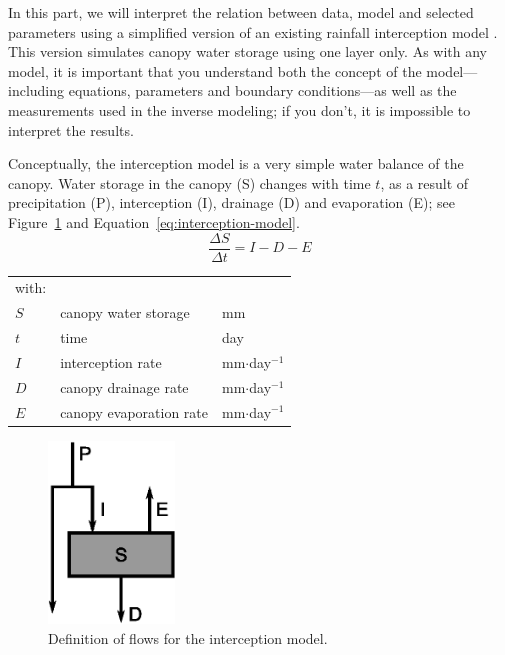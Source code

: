 In this part, we will interpret the relation between data, model and selected parameters using a simplified version of an existing rainfall interception model \citep{bout-scha-aert-verm1996}. This version simulates canopy water storage using one layer only. As with any model, it is important that you understand both the concept of the model---including equations, parameters and boundary conditions---as well as the measurements used in the inverse modeling; if you don't, it is impossible to interpret the results.

Conceptually, the interception model is a very simple water balance of the canopy. Water storage in the canopy (S) changes with time $t$, as a result of precipitation (P), interception (I), drainage (D) and evaporation (E); see Figure~\ref{fig:interception-model-flows} and Equation~\ref{eq:interception-model}. 
\begin{equation}
\label{eq:interception-model}
\frac{\Delta S}{\Delta t} = I-D-E
\end{equation}
\begin{tabular}{lll}
with:&&\\
$S$&canopy water storage&\textsf{mm}\\
$t$&time&\textsf{day}\\
$I$&interception rate&\textsf{mm$\cdot{}$day$^{-1}$}\\
$D$&canopy drainage rate&\textsf{mm$\cdot{}$day$^{-1}$}\\
$E$&canopy evaporation rate&\textsf{mm$\cdot{}$day$^{-1}$}\\
\end{tabular}

\begin{figure}[htbp]
  \centering
    \includegraphics[width=0.3\textwidth]{./../eps/interceptionmodel-flows.eps}
  \caption{Definition of flows for the interception model.}
  \label{fig:interception-model-flows}
\end{figure}

